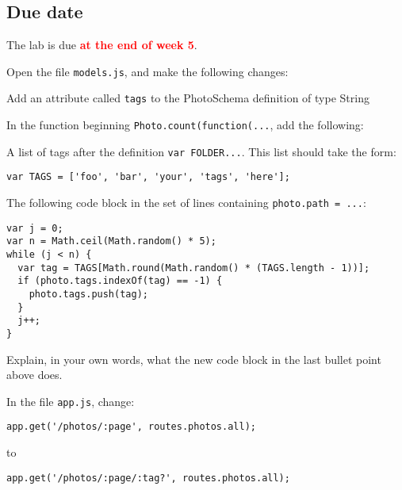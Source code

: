 \documentclass{article}
\newcommand{\labduedate}{at the end of week 5}
\begin{document}
\subsection*{Due date}
The lab is due \textcolor{red}{\textbf{\labduedate}}.




Open the file \verb!models.js!, and make the following changes:

\begin{itemize*}
\item Add an attribute called \verb!tags! to the PhotoSchema definition of type String
\item In the function beginning \verb!Photo.count(function(...!, add the following:
\begin{itemize*}
\item A list of tags after the definition \verb!var FOLDER...!. This list should take the form:

\begin{verbatim}
var TAGS = ['foo', 'bar', 'your', 'tags', 'here'];
\end{verbatim}

\item The following code block in the set of lines containing \verb!photo.path = ...!:

\begin{verbatim}
var j = 0;
var n = Math.ceil(Math.random() * 5);
while (j < n) {
  var tag = TAGS[Math.round(Math.random() * (TAGS.length - 1))];
  if (photo.tags.indexOf(tag) == -1) {
    photo.tags.push(tag);
  }
  j++;
}
\end{verbatim}
\end{itemize*}
\end{itemize*}

 Explain, in your own words, what the new code block in the last bullet point above does.


In the file \verb!app.js!, change:

\begin{verbatim}
app.get('/photos/:page', routes.photos.all);
\end{verbatim}

to

\begin{verbatim}
app.get('/photos/:page/:tag?', routes.photos.all);
\end{verbatim}
\end{document}
